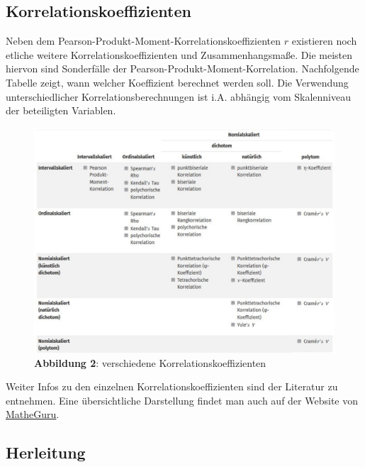\documentclass[]{article}
\begin{document}
\subsection*{Korrelationskoeffizienten}\label{korrelationskoeffizienten}

Neben dem Pearson-Produkt-Moment-Korrelationskoeffizienten \(r\)
existieren noch etliche weitere Korrelationskoeffizienten und
Zusammenhangsmaße. Die meisten hiervon sind Sonderfälle der
Pearson-Produkt-Moment-Korrelation. Nachfolgende Tabelle zeigt, wann
welcher Koeffizient berechnet werden soll. Die Verwendung
unterschiedlicher Korrelationsberechnungen ist i.A. abhängig vom
Skalenniveau der beteiligten Variablen.

\begin{figure}
\centering
\includegraphics[width=1.00000\textwidth]{Images/Korrelationskoeffizienten.JPG}
\caption{\textbf{Abbildung 2}: verschiedene Korrelationskoeffizienten}
\end{figure}

Weiter Infos zu den einzelnen Korrelationskoeffizienten sind der
Literatur zu entnehmen. Eine übersichtliche Darstellung findet man auch
auf der Website von
\href{https://matheguru.com/stochastik/korrelation-korrelationskoeffizient.html}{MatheGuru}.

\subsection*{Herleitung}\label{herleitung}
\end{document}
